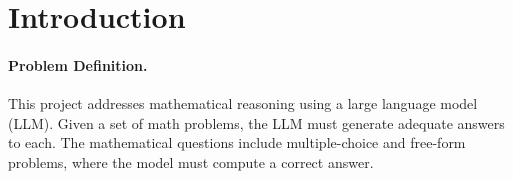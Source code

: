 \documentclass{article}
\begin{document}





\section{Introduction}
\label{sec:intro}

\paragraph{Problem Definition.}

This project addresses mathematical reasoning using a large language model (LLM). Given a set of math problems, the LLM must generate adequate answers to each. The mathematical questions include multiple-choice and free-form problems, where the model must compute a correct answer.
\end{document}
